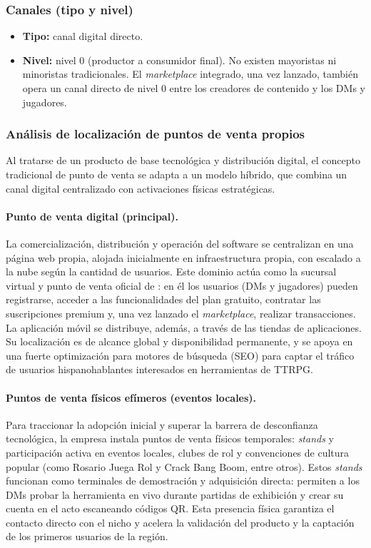 \subsubsection{Canales (tipo y nivel)}
\begin{itemize}
  \item \textbf{Tipo:} canal digital directo.
  \item \textbf{Nivel:} nivel 0 (productor a consumidor final). No existen mayoristas ni minoristas tradicionales. El \textit{marketplace} integrado, una vez lanzado, también opera un canal directo de nivel 0 entre los creadores de contenido y los DMs y jugadores.
\end{itemize}

\subsubsection{Análisis de localización de puntos de venta propios}
Al tratarse de un producto de base tecnológica y distribución digital, el concepto tradicional de punto de venta se adapta a un modelo híbrido, que combina un canal digital centralizado con activaciones físicas estratégicas.

\paragraph{Punto de venta digital (principal).}
La comercialización, distribución y operación del software se centralizan en una página web propia, alojada inicialmente en infraestructura propia, con escalado a la nube según la cantidad de usuarios. Este dominio actúa como la sucursal virtual y punto de venta oficial de \nombreproyecto{}: en él los usuarios (DMs y jugadores) pueden registrarse, acceder a las funcionalidades del plan gratuito, contratar las suscripciones premium y, una vez lanzado el \textit{marketplace}, realizar transacciones. La aplicación móvil se distribuye, además, a través de las tiendas de aplicaciones. Su localización es de alcance global y disponibilidad permanente, y se apoya en una fuerte optimización para motores de búsqueda (SEO) para captar el tráfico de usuarios hispanohablantes interesados en herramientas de TTRPG.

\paragraph{Puntos de venta físicos efímeros (eventos locales).}
Para traccionar la adopción inicial y superar la barrera de desconfianza tecnológica, la empresa instala puntos de venta físicos temporales: \textit{stands} y participación activa en eventos locales, clubes de rol y convenciones de cultura popular (como Rosario Juega Rol y Crack Bang Boom, entre otros). Estos \textit{stands} funcionan como terminales de demostración y adquisición directa: permiten a los DMs probar la herramienta en vivo durante partidas de exhibición y crear su cuenta en el acto escaneando códigos QR. Esta presencia física garantiza el contacto directo con el nicho y acelera la validación del producto y la captación de los primeros usuarios de la región.

